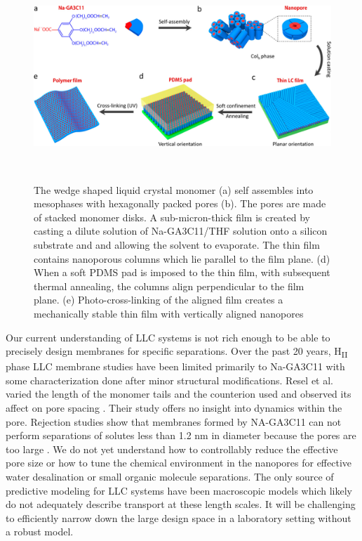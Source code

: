 \documentclass{article}
\begin{document}
  \begin{figure} \centering
  \includegraphics[width=\linewidth]{soft_confinement.png} \caption{The wedge
	  shaped liquid crystal monomer (a) self assembles into mesophases with
		  hexagonally packed pores (b). The pores are made of stacked monomer disks. A
		  sub-micron-thick film is created by casting a dilute solution of Na-GA3C11/THF
		  solution onto a silicon substrate and and allowing the solvent to evaporate.
		  The thin film contains nanoporous columns which lie parallel to the film plane.
		  (d) When a soft PDMS pad is imposed to the thin film, with subsequent thermal
		  annealing, the columns align perpendicular to the film plane. (e)
		  Photo-cross-linking of the aligned film creates a mechanically stable thin film
		  with vertically aligned nanopores}~\label{fig:soft} \end{figure}

  Our current understanding of LLC systems is not rich enough to be able to
  precisely design membranes for specific separations. Over the past 20 years,
  H\textsubscript{II} phase LLC membrane studies have been limited primarily to
  Na-GA3C11 with some characterization done after minor structural modifications.
  Resel et al. varied the length of the monomer tails and the counterion used and
  observed its affect on pore spacing \cite{resel_structural_2000}.  Their study
  offers no insight into dynamics within the pore. Rejection studies show that
  membranes formed by NA-GA3C11 can not perform separations of solutes less than
  1.2 nm in diameter because the pores are too large \cite{zhou_supported_2005}.
  We do not yet understand how to controllably reduce the effective pore size or
  how to tune the chemical environment in the nanopores for effective water
  desalination or small organic molecule separations. The only source of
  predictive modeling for LLC systems have been macroscopic models which likely
  do not adequately describe transport at these length scales.
  \cite{hatakeyama_water_2011} It will be challenging to efficiently narrow down
  the large design space in a laboratory setting without a robust model.
\end{document}
